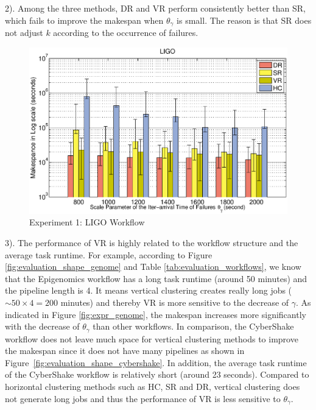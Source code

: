 \documentclass{IOS-Book-Article}
\begin{document}
2). Among the three methods, DR and VR perform consistently better than SR, which fails to improve the makespan when $\theta_{\gamma}$ is small. The reason is that SR does not adjust $k$ according to the occurrence of failures. 

\begin{figure}[!htb]
\centering
  \includegraphics[width=1\linewidth]{ligo.eps}
  \caption{Experiment 1: LIGO Workflow}
  \label{fig:expr_ligo}
\end{figure}

3). The performance of VR is highly related to the workflow structure and the average task runtime. For example, according to Figure \ref{fig:evaluation_shape_genome} and Table \ref{tab:evaluation_workflows}, we know that the Epigenomics workflow has a long task runtime (around 50 minutes) and the pipeline length is 4. It means vertical clustering creates really long jobs ($\sim 50\times 4=200$ minutes) and thereby VR is more sensitive to the decrease of $\gamma$. As indicated in Figure \ref{fig:expr_genome}, the makespan increases more significantly with the decrease of $\theta_{\gamma}$ than other workflows. In comparison, the CyberShake workflow does not leave much space for vertical clustering methods to improve the makespan since it does not have many pipelines as shown in Figure~\ref{fig:evaluation_shape_cybershake}. In addition, the average task runtime of the CyberShake workflow is relatively short (around 23 seconds). Compared to horizontal clustering methods such as HC, SR and DR, vertical clustering does not generate long jobs and thus the performance of VR is less  sensitive to $\theta_{\gamma}$. 
\end{document}
